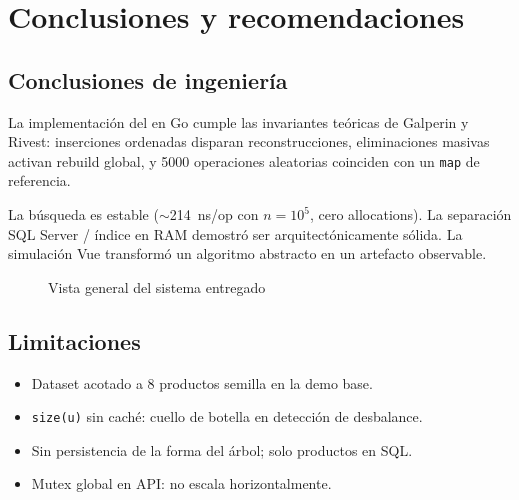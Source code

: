 \chapter{Conclusiones y recomendaciones}

\section{Conclusiones de ingeniería}

La implementación del \Scapegoat{} en Go cumple las invariantes teóricas de Galperin y Rivest: inserciones ordenadas disparan reconstrucciones, eliminaciones masivas activan rebuild global, y 5000 operaciones aleatorias coinciden con un \texttt{map} de referencia.

La búsqueda es estable ($\sim$214~ns/op con $n=10^5$, cero allocations). La separación SQL Server / índice en RAM demostró ser arquitectónicamente sólida. La simulación Vue transformó un algoritmo abstracto en un artefacto observable.

\begin{figure}[H]
  \centering
  \caption{Vista general del sistema entregado}
  \label{fig:vista-general}
\end{figure}

\section{Limitaciones}

\begin{itemize}
  \item Dataset acotado a 8 productos semilla en la demo base.
  \item \texttt{size(u)} sin caché: cuello de botella en detección de desbalance.
  \item Sin persistencia de la forma del árbol; solo productos en SQL.
  \item Mutex global en API: no escala horizontalmente.
\end{itemize}

